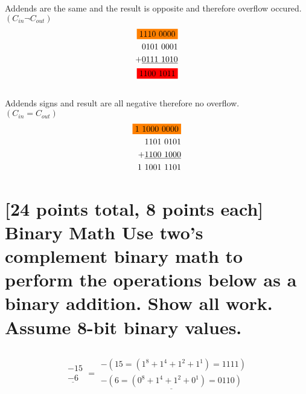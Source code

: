 \documentclass[12pt]{article}
\begin{document}
\subsection{}
Addends are the same and the result is opposite and therefore overflow occured. \\
$(C_{in} \neg C_{out})$
\begin{equation}
	\begin{split}
		\colorbox{orange}{1110\ 0000} \\
		0101\ 0001 \\ + \underline{0111\ 1010}\\
		\colorbox{red}{1100\ 1011}
	\end{split}
\end{equation}

\subsection{}
Addends signs and result are all negative therefore no overflow.\\
$(C_{in} = C_{out})$
\begin{equation}
	\begin{split}
		\colorbox{orange}{1\ 1000\ 0000}\\
		1101\ 0101 \\ + \underline{1100\ 1000}\\
		1\ 1001\ 1101 
	\end{split}
\end{equation}

\section{
	[24 points total, 8 points each] Binary Math
Use two's complement binary math to perform the operations below as a binary addition.
Show all work. Assume 8-bit binary values.
}
\subsection{}
\begin{equation}
\begin{split}
-15\\  
\underline{-6}
\end{split}
=
\begin{split}
-(15 = (1^8 + 1^4 + 1^2 + 1^1) = 1111)\\ \underline{-(6 = (0^8 + 1^4 + 1^2 + 0^1) = 0110)}
\end{split}

%
%
\end{equation}	
	
\end{document}
